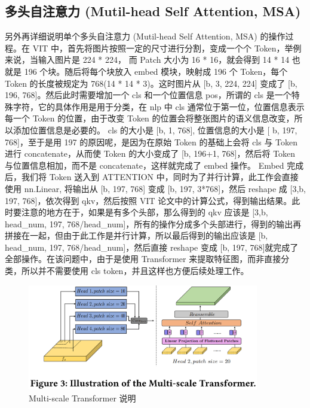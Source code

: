 \subsection{多头自注意力 (Mutil-head Self Attention, MSA)}

另外再详细说明单个多头自注意力 (Mutil-head Self Attention, MSA) 的操作过程。在 VIT 中，首先将图片按照一定的尺寸进行分割，变成一个个 Token，举例来说，当输入图片是 224 * 224， 而 Patch 大小为 16 * 16，就会得到 14 * 14 也就是 196 个块。随后将每个块放入 embed 模块，映射成 196 个 Token，每个 Token 的长度被规定为 768(14 * 14 * 3)。这时图片从 [b, 3, 224, 224] 变成了 [b, 196, 768]。然后此时需要增加一个 cls 和一个位置信息 pos，所谓的 cls 是一个特殊字符，它的具体作用是用于分类，在 nlp 中 cls 通常位于第一位，位置信息表示每一个 Token 的位置，由于改变 Token 的位置会将整张图片的语义信息改变，所以添加位置信息是必要的。 cls 的大小是 [b, 1, 768], 位置信息的大小是 [ b, 197, 768]，至于是用 197 的原因呢，是因为在原始 Token 的基础上会将 cls 与 Token 进行 concatenate，从而使 Token 的大小变成了 [b, 196+1, 768]，然后将 Token 与位置信息相加，而不是 concatenate，这样就完成了 embed 操作。 Embed 完成后，我们将 Token 送入到 ATTENTION 中，同时为了并行计算，此工作会直接使用 nn.Linear, 将输出从 [b, 197, 768] 变成 [b, 197, 3*768]，然后 reshape 成 [3,b, 197, 768]，依次得到 qkv，然后按照 VIT 论文中的计算公式，得到输出结果。此时要注意的地方在于，如果是有多个头部，那么得到的 qkv 应该是 [3,b, head\_num, 197, 768/head\_num]，所有的操作分成多个头部进行，得到的输出再拼接在一起，但由于此工作是并行计算，所以最后得到的输出应该是 [b, head\_num, 197, 768/head\_num]，然后直接 reshape 变成 [b, 197, 768]就完成了全部操作。在该问题中，由于是使用 Transformer 来提取特征图，而非直接分类，所以并不需要使用 cls token，并且这样也方便后续处理工作。

\begin{figure}[htb]
\centering 
\includegraphics[width=0.90\textwidth]{img/ch4m13.png} 
\caption{Multi-scale Transformer 说明}
\label{Test}
\end{figure}

